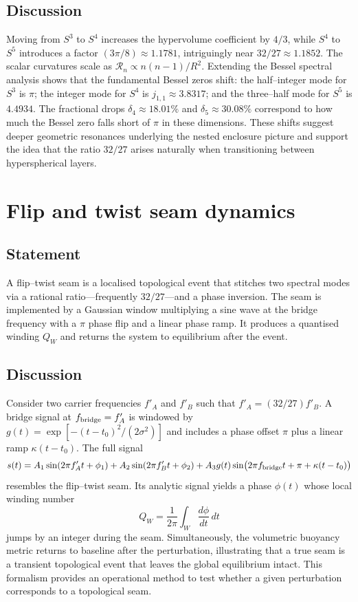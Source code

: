 \documentclass{article}
\begin{document}
\subsection{Discussion}
Moving from $S^3$ to $S^4$ increases the hypervolume coefficient by $4/3$, while $S^4$ to $S^5$ introduces a factor $(3\pi/8)\approx1.1781$, intriguingly near $32/27\approx1.1852$.  The scalar curvatures scale as $\mathcal{R}_n \propto n(n-1)/R^2$.  Extending the Bessel spectral analysis shows that the fundamental Bessel zeros shift: the half–integer mode for $S^3$ is $\pi$; the integer mode for $S^4$ is $j_{1,1}\approx3.8317$; and the three–half mode for $S^5$ is $4.4934$.  The fractional drops $\delta_4 \approx 18.01\%$ and $\delta_5 \approx30.08\%$ correspond to how much the Bessel zero falls short of $\pi$ in these dimensions.  These shifts suggest deeper geometric resonances underlying the nested enclosure picture and support the idea that the ratio $32/27$ arises naturally when transitioning between hyperspherical layers.

\section{Flip and twist seam dynamics}
\label{sec:flip}
\subsection{Statement}
A flip–twist seam is a localised topological event that stitches two spectral modes via a rational ratio—frequently $32/27$—and a phase inversion.  The seam is implemented by a Gaussian window multiplying a sine wave at the bridge frequency with a $\pi$ phase flip and a linear phase ramp.  It produces a quantised winding $Q_W$ and returns the system to equilibrium after the event.

\subsection{Discussion}
Consider two carrier frequencies $f'_A$ and $f'_B$ such that $f'_A = (32/27) f'_B$.  A bridge signal at $f_{\rm bridge}=f'_A$ is windowed by $g(t)=\exp[-(t-t_0)^2/(2\sigma^2)]$ and includes a phase offset $\pi$ plus a linear ramp $\kappa(t-t_0)$.  The full signal
\[
s(t)=A_1 \sin(2\pi f'_A t + \phi_1) + A_2 \sin(2\pi f'_B t + \phi_2) + A_3 g(t) \sin\bigl(2\pi f_{\rm bridge} t + \pi + \kappa(t-t_0)\bigr)
\]
resembles the flip–twist seam.  Its analytic signal yields a phase $\phi(t)$ whose local winding number
\[
Q_W = \frac{1}{2\pi} \int_{W} \frac{d\phi}{dt} \, dt
\]
jumps by an integer during the seam.  Simultaneously, the volumetric buoyancy metric returns to baseline after the perturbation, illustrating that a true seam is a transient topological event that leaves the global equilibrium intact.  This formalism provides an operational method to test whether a given perturbation corresponds to a topological seam.
\end{document}
